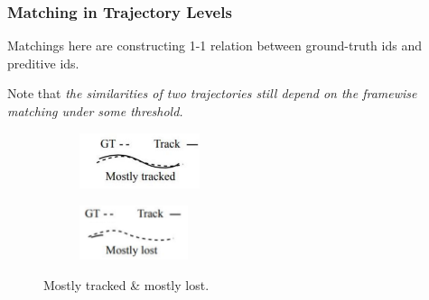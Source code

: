 \documentclass[slidetop, mathserif]{beamer}
\begin{document}
\begin{frame}
	\frametitle{Matching in Trajectory Levels}
			    
		
	Matchings here are constructing 1-1 relation between ground-truth ids and preditive ids.
			    
	\quad
			
	Note that \emph{the similarities of two trajectories still depend on the
	framewise matching under some threshold.}
	\begin{figure}
		\begin{subfigure}{.5\textwidth}
			\centering
			\includegraphics[width=100pt]{pics/fig4.png}
		\end{subfigure}%
		\begin{subfigure}{.5\textwidth}
			\centering
			\includegraphics[width=90pt]{pics/fig5.png}
		\end{subfigure}
		\caption{Mostly tracked \& mostly lost.}
	\end{figure}
			
\end{frame}
\end{document}
